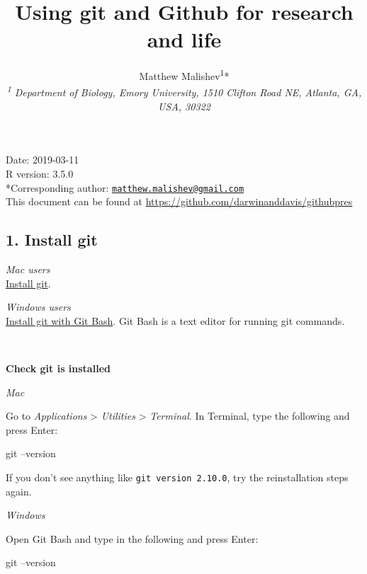 \documentclass[10,portrait]{article}
\title{Using git and Github for research and life}
\author{Matthew
Malishev\textsuperscript{1}*\\[2\baselineskip]\emph{\textsuperscript{1}
Department of Biology, Emory University, 1510 Clifton Road NE, Atlanta,
GA, USA, 30322}}
\date{}
\newenvironment{Shaded}{\begin{snugshade}}{\end{snugshade}}
\newcommand{\FunctionTok}[1]{\textcolor[rgb]{0.00,0.00,0.00}{#1}}
\newcommand{\NormalTok}[1]{#1}
\begin{document}
\maketitle

{
\hypersetup{linkcolor=black}
\setcounter{tocdepth}{3}
\tableofcontents
}
\newpage   

Date: 2019-03-11\\
R version: 3.5.0\\
*Corresponding author:
\href{mailto:matthew.malishev@gmail.com}{\nolinkurl{matthew.malishev@gmail.com}}\\
This document can be found at
\url{https://github.com/darwinanddavis/githubpres}

\newpage    

\subsection{1. Install git}\label{install-git}

\emph{Mac users}\\
\href{https://git-scm.com/book/en/v2/Getting-Started-Installing-Git}{Install
git}.

\emph{Windows users}\\
\href{https://www.sitereq.com/post/easiest-way-to-install-git-bash-commands-on-windows\#git-bash-windows-installation}{Install
git with Git Bash}. Git Bash is a text editor for running git commands.

~ ~ ~

\textbf{Check git is installed}

\emph{Mac}

Go to \emph{Applications} \textgreater{} \emph{Utilities} \textgreater{}
\emph{Terminal}. In Terminal, type the following and press Enter:

\begin{Shaded}
\begin{Highlighting}[]

\FunctionTok{git}\NormalTok{ --version }
\end{Highlighting}
\end{Shaded}

If you don't see anything like \texttt{git\ version\ 2.10.0}, try the
reinstallation steps again.

\emph{Windows}

Open Git Bash and type in the following and press Enter:

\begin{Shaded}
\begin{Highlighting}[]

\FunctionTok{git}\NormalTok{ --version  }
\end{Highlighting}
\end{Shaded}
\end{document}
